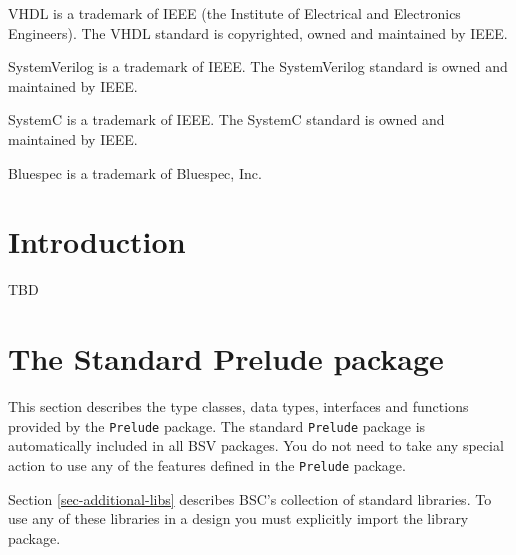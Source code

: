 \documentclass{article}
\newcommand{\te}[1]{\texttt{#1}}
\begin{document}
VHDL is a trademark of IEEE (the Institute of Electrical and
Electronics Engineers).  The VHDL standard is copyrighted, owned and
maintained by IEEE.

SystemVerilog is a trademark of IEEE.  The SystemVerilog standard is
owned and maintained by IEEE.

SystemC is a trademark of IEEE.  The SystemC standard is owned and
maintained by IEEE.

Bluespec is a trademark of Bluespec, Inc.


\newpage

\clearpage
{}
{}

\tableofcontents

\newpage



\section{Introduction}

TBD


\clearpage

\section{The Standard Prelude package}

\label{sec-prelude}
\label{lib-prelude}

This section describes the type classes, data types, interfaces and
functions  provided by the \te{Prelude} package.
The standard \te{Prelude} package is automatically included in all BSV
packages.   You do not  need to take any special
action to use any of the features defined in the \te{Prelude} package.


Section {\ref{sec-additional-libs}} describes BSC's collection
of standard libraries.  To use any of these libraries in a
design you must explicitly import the library package.



\end{document}

